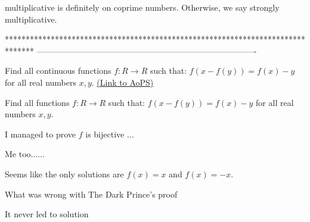 \begin{solution}
	multiplicative is definitely on coprime numbers. Otherwise, we say strongly multiplicative.
\end{solution}
*******************************************************************************
-------------------------------------------------------------------------------

\begin{problem}
	Find all continuous functions $f:R\rightarrow R$ such that:
$f(x-f(y))=f(x)-y$ for all real numbers $x,y$.
	\flushright \href{https://artofproblemsolving.com/community/c6h1575796}{(Link to AoPS)}
\end{problem}



\begin{solution}
	\begin{tcolorbox}Find all functions $f:R\rightarrow R$ such that:
$f(x-f(y))=f(x)-y$ for all real numbers $x,y$.\end{tcolorbox}

I managed to prove $f$ is bijective ...
\end{solution}



\begin{solution}
	Me too......
\end{solution}



\begin{solution}
	Seems like the only solutions are $f(x)=x$ and $f(x)=-x$.
\end{solution}



\begin{solution}
	What was wrong with The Dark Prince's proof
\end{solution}



\begin{solution}
	It never led to solution
\end{solution}



